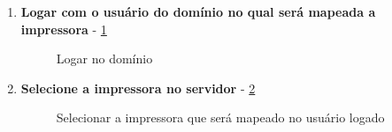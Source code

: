 \begin{enumerate}
	\item \textbf{Logar com o usuário do domínio no qual será mapeada a impressora} - \ref{login_dominio}
	\begin{figure}[ht]
	   	\centering
	   	\caption{Logar no domínio}
	    \label{login_dominio}
	\end{figure}
	
	\item \textbf{Selecione a impressora no servidor} - \ref{selecionar_impressora_servidor}
	\begin{figure}[ht]
	   	\centering
	   	\caption{Selecionar a impressora que será mapeado no usuário logado}
	    \label{selecionar_impressora_servidor}
	\end{figure}
	

\end{enumerate}
